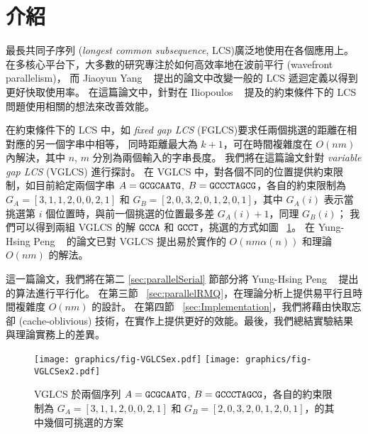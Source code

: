 \section{介紹} %
\label{sec:Introduction}

最長共同子序列 (\emph{longest common subsequence}, LCS)廣泛地使用在各個應用上。
在多核心平台下，大多數的研究專注於如何高效率地在波前平行 (wavefront parallelism)，
而 Jiaoyun Yang ~\cite{jiaoyun} 提出的論文中改變一般的 LCS 遞迴定義以得到更好快取使用率。
在這篇論文中，針對在 Iliopoulos ~\cite{iliopoulos} 提及的約束條件下的 LCS 問題使用相關的想法來改善效能。

在約束條件下的 LCS 中，如 \emph{fixed gap LCS } (FGLCS)要求任兩個挑選的距離在相對應的另一個字串中相等，
同時距離最大為 $k+1$，可在時間複雜度在 $O(nm)$ 內解決，其中 $n$, $m$ 分別為兩個輸入的字串長度。
我們將在這篇論文針對 \emph{variable gap LCS} (VGLCS) 進行探討。
在 VGLCS 中，對各個不同的位置提供約束限制，如目前給定兩個字串 $A = \tt{GCGCAATG}$, 
$B = \tt{GCCCTAGCG}$，各自的約束限制為 $G_A = [3, 1, 1, 2, 0, 0, 2, 1]$ 
和 $G_B = [2, 0, 3, 2, 0, 1, 2, 0, 1]$，其中 $G_A(i)$ 表示當挑選第 $i$ 個位置時，與前一個挑選的位置最多差 $G_A(i)+1$，同理 $G_B(i)$；
我們可以得到兩組 VGLCS 的解 $\tt{GCCA}$ 和 $\tt{GCCT}$，挑選的方式如圖 ~\ref{fig:VGLCSex}。
在 Yung-Hsing Peng ~\cite{yunghsing} 的論文已對 VGLCS 提出易於實作的 $O(nm \alpha(n))$ 和理論 $O(nm)$ 的解法。

這一篇論文，我們將在第二 \ref{sec:parallelSerial} 節部分將 Yung-Hsing Peng ~\cite{yunghsing} 提出的算法進行平行化。
在第三節 ~\ref{sec:parallelRMQ}，在理論分析上提供易平行且時間複雜度 $O(nm)$ 的設計。
在第四節 ~\ref{sec:Implementation}，我們將藉由快取忘卻 (cache-oblivious) 技術，在實作上提供更好的效能。最後，我們總結實驗結果與理論實務上的差異。

\begin{figure}[!thb]
  \centering
  \texttt{[image: graphics/fig-VGLCSex.pdf]}
  \texttt{[image: graphics/fig-VGLCSex2.pdf]}
  \caption{VGLCS 於兩個序列 $A = \tt{GCGCAATG}$, $B = \tt{GCCCTAGCG}$，各自的約束限制為 $G_A = [3, 1, 1, 2, 0, 0, 2, 1]$ 和 $G_B = [2, 0, 3, 2, 0, 1, 2, 0, 1]$，的其中幾個可挑選的方案}
  \label{fig:VGLCSex}
\end{figure}